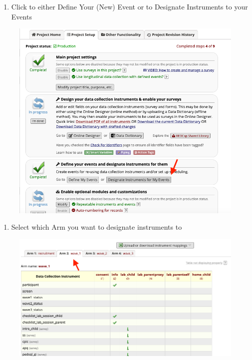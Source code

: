 \documentclass[]{book}
\providecommand{\tightlist}{%
  \setlength{\itemsep}{0pt}\setlength{\parskip}{0pt}}
\begin{document}
\begin{enumerate}
\def\labelenumi{\arabic{enumi}.}
\setcounter{enumi}{1}
\tightlist
\item
  Click to either Define Your (New) Event or to Designate Instruments to your Events
\end{enumerate}

\begin{figure}
\centering
\includegraphics{images/lab_protocols/redcap/3.png}
\caption{}
\end{figure}

\begin{enumerate}
\def\labelenumi{\arabic{enumi}.}
\setcounter{enumi}{2}
\tightlist
\item
  Select which Arm you want to designate instruments to
\end{enumerate}

\begin{figure}
\centering
\includegraphics{images/lab_protocols/redcap/4.png}
\caption{}
\end{figure}
\end{document}
